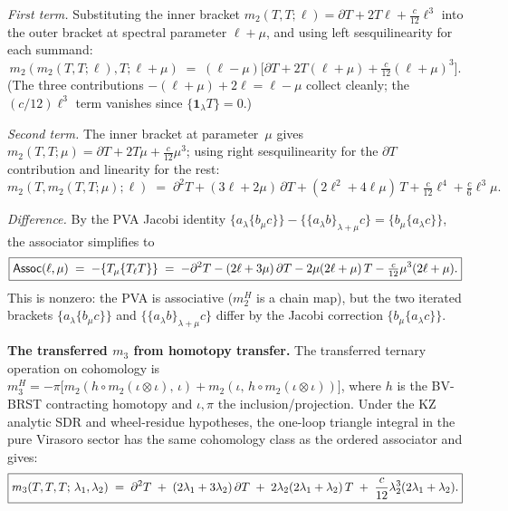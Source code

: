 \smallskip
\emph{First term.} Substituting the inner bracket
$m_2(T,T;\ell) = \partial T + 2T\ell + \tfrac{c}{12}\ell^3$
into the outer bracket at spectral parameter $\ell + \mu$, and using left sesquilinearity
for each summand:
\begin{equation}
\label{eq:vir-LHS-first}
m_2(m_2(T,T;\ell),T;\ell{+}\mu)
\;=\; (\ell - \mu)\bigl[\partial T + 2T(\ell{+}\mu) + \tfrac{c}{12}(\ell{+}\mu)^3\bigr].
\end{equation}
(The three contributions $-(\ell{+}\mu) + 2\ell = \ell - \mu$ collect cleanly; the $(c/12)\ell^3$ term vanishes since $\{\mathbf{1}_\lambda T\} = 0$.)

\smallskip
\emph{Second term.} The inner bracket at parameter~$\mu$
gives $m_2(T,T;\mu) = \partial T + 2T\mu + \tfrac{c}{12}\mu^3$;
using right sesquilinearity for the $\partial T$ contribution and linearity for the rest:
\begin{equation}
\label{eq:vir-LHS-second}
m_2(T,m_2(T,T;\mu);\ell)
\;=\; \partial^2 T + (3\ell + 2\mu)\,\partial T
 + (2\ell^2 + 4\ell\mu)\,T
 + \tfrac{c}{12}\ell^4 + \tfrac{c}{6}\ell^3\mu.
\end{equation}

\smallskip
\emph{Difference.} By the PVA Jacobi identity
$\{a_\lambda \{b_\mu c\}\} - \{\{a_\lambda b\}_{\lambda+\mu} c\} = \{b_\mu \{a_\lambda c\}\}$,
the associator simplifies to
\begin{equation}
\label{eq:vir-associator}
\boxed{%
\mathsf{Assoc}(\ell,\mu)
\;=\; -\{T_\mu \{T_\ell T\}\}
\;=\; -\partial^2 T - (2\ell + 3\mu)\,\partial T - 2\mu(2\ell + \mu)\,T
 - \tfrac{c}{12}\mu^3(2\ell + \mu).
}
\end{equation}
This is nonzero: the PVA is associative ($m_2^H$ is a chain map), but the
two iterated brackets $\{a_\lambda\{b_\mu c\}\}$ and $\{\{a_\lambda b\}_{\lambda+\mu} c\}$
differ by the Jacobi correction $\{b_\mu\{a_\lambda c\}\}$.

\medskip
\noindent\textbf{The transferred $m_3$ from homotopy transfer.}
The transferred ternary operation on cohomology is
$m_3^H = -\pi\bigl[m_2(h \circ m_2(\iota{\otimes}\iota),\,\iota)
+ m_2(\iota,\, h \circ m_2(\iota{\otimes}\iota))\bigr]$,
where $h$ is the BV-BRST contracting homotopy and $\iota, \pi$ the
inclusion/projection. Under the KZ analytic SDR and wheel-residue
hypotheses, the one-loop triangle integral in the pure Virasoro sector
has the same cohomology class as the ordered associator and gives:
\begin{equation}
\label{eq:vir-m3}
\boxed{%
m_3(T,T,T;\,\lambda_1,\lambda_2)
\;=\;
\partial^2 T
\;+\; (2\lambda_1 + 3\lambda_2)\,\partial T
\;+\; 2\lambda_2(2\lambda_1 + \lambda_2)\,T
\;+\; \frac{c}{12}\lambda_2^3(2\lambda_1 + \lambda_2).
}
\end{equation}

